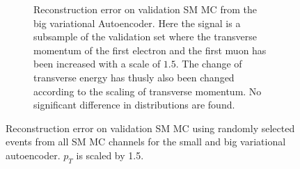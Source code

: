 \begin{figure}[h!]
\begin{subfigure}{.45\textwidth}
        \caption{Reconstruction error on validation SM MC from the big variational Autoencoder. Here the signal is a subsample of the validation 
        set where the transverse momentum of the first electron and the first muon has been increased with a scale of $1.5$. The change of transverse 
        energy has thusly also been changed according to the scaling of transverse momentum. No significant difference in distributions are found. }
        \label{fig:VAE_big_pt_1_5}
    \end{subfigure}
    \hfill 
    \caption[VAE |Reconstruction error $p_T$ altering of 1.5]{Reconstruction error on validation SM MC using randomly selected events from all SM 
    MC channels for the small and big variational autoencoder. $p_T$ is scaled by 1.5. }
    \label{fig:VAE_big_small_pt_1_5}
\end{figure}

